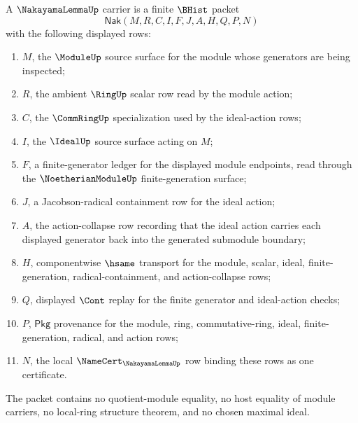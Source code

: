 \begin{definition}
\label{def:nakayama-lemma-carrier}
A $\NakayamaLemmaUp$ carrier is a finite $\BHist$ packet
$$
\mathsf{Nak}(M,R,C,I,F,J,A,H,Q,P,N)
$$
with the following displayed rows:
\begin{enumerate}
\item $M$, the $\ModuleUp$ source surface for the module whose generators are
being inspected;
\item $R$, the ambient $\RingUp$ scalar row read by the module action;
\item $C$, the $\CommRingUp$ specialization used by the ideal-action rows;
\item $I$, the $\IdealUp$ source surface acting on $M$;
\item $F$, a finite-generator ledger for the displayed module endpoints,
read through the $\NoetherianModuleUp$ finite-generation surface;
\item $J$, a Jacobson-radical containment row for the ideal action;
\item $A$, the action-collapse row recording that the ideal action carries
each displayed generator back into the generated submodule boundary;
\item $H$, componentwise $\hsame$ transport for the module, scalar, ideal,
finite-generation, radical-containment, and action-collapse rows;
\item $Q$, displayed $\Cont$ replay for the finite generator and ideal-action
checks;
\item $P$, $\mathsf{Pkg}$ provenance for the module, ring, commutative-ring,
ideal, finite-generation, radical, and action rows;
\item $N$, the local $\NameCert_{\NakayamaLemmaUp}$ row binding these rows as
one certificate.
\end{enumerate}
The packet contains no quotient-module equality, no host equality of module
carriers, no local-ring structure theorem, and no chosen maximal ideal.
\end{definition}

